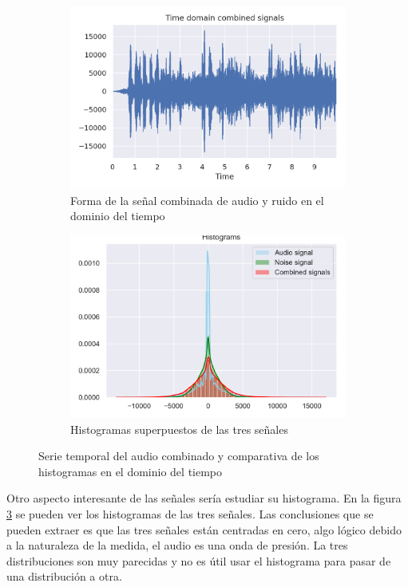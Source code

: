 \begin{figure}[h!]
	\centering
	\begin{subfigure}[t]{0.5\textwidth}
		\centering
		\includegraphics[width=\columnwidth]{figures/combination_time.png}
		\caption{Forma de la señal combinada de audio y ruido en el dominio del tiempo}
		\label{fig: combination_time}
	\end{subfigure}%
	\hspace*{10pt}
	\begin{subfigure}[t]{0.5\textwidth}
		\centering
		\includegraphics[width=\columnwidth]{figures/hist_time.png}
		\caption{Histogramas superpuestos de las tres señales}
		\label{fig: hist_time}
	\end{subfigure}
	\caption{Serie temporal del audio combinado y comparativa de los histogramas en el dominio del tiempo}
\end{figure}

Otro aspecto interesante de las señales sería estudiar su histograma. En la figura \ref{fig: hist_time} se pueden ver los histogramas de las tres señales. Las conclusiones que se pueden extraer es que las tres señales están centradas en cero, algo lógico debido a la naturaleza de la medida, el audio es una onda de presión. La tres distribuciones son muy parecidas y no es útil usar el histograma para pasar de una distribución a otra.